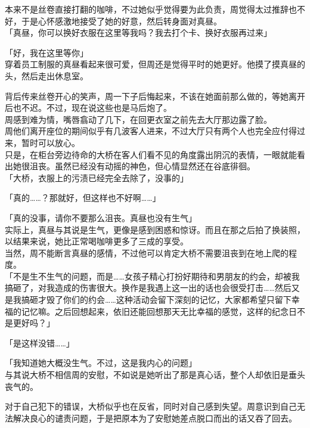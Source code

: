 本来不是丝卷直接打翻的咖啡，不过她似乎觉得要为此负责，周觉得太过推辞也不好，于是心怀感激地接受了她的好意，然后转身面对真昼。\\

「真昼，你可以换好衣服在这里等我吗？我去打个卡、换好衣服再过来」

「好，我在这里等你」\\

穿着员工制服的真昼看起来很可爱，但周还是觉得平时的她更好。他摸了摸真昼的头，然后走出休息室。

背后传来丝卷开心的笑声，周一下子后悔起来，不该在她面前那么做的，等她离开后也不迟。不过，现在说这些也是马后炮了。\\

周感到难为情，嘴唇翕动了几下，在回更衣室之前先去大厅那边露了脸。\\

周他们离开座位的期间似乎有几波客人进来，不过大厅只有两个人也完全应付得过来，暂时可以放心。\\

只是，在柜台旁边待命的大桥在客人们看不见的角度露出阴沉的表情，一眼就能看出她很沮丧。虽然已经没有动摇的神色，但心情显然还在谷底徘徊。\\

「大桥，衣服上的污渍已经完全去除了，没事的」

「真的……？那就好，但这样也不好啊……」

「真的没事，请你不要那么沮丧。真昼也没有生气」\\

实际上，真昼与其说是生气，更像是感到困惑和惊讶。而且在那之后拍了换装照，以结果来说，她比正常喝咖啡更多了三成的享受。\\

当然，周不能断言真昼的感情，不过他可以肯定大桥不需要沮丧到在地上爬的程度。\\

「不是生不生气的问题，而是……女孩子精心打扮好期待和男朋友的约会，却被我搞砸了，对我造成的伤害很大。换作是我遇上这一出的话也会很受打击……然后又是我搞砸才毁了你们的约会……这种活动会留下深刻的记忆，大家都希望只留下幸福的记忆嘛。之后回想起来，依旧还能回想那天无比幸福的感觉，这样的纪念日不是更好吗？」

「是这样没错……」

「我知道她大概没生气。不过，这是我内心的问题」\\

与其说大桥不相信周的安慰，不如说是她听出了那是真心话，整个人却依旧是垂头丧气的。

对于自己犯下的错误，大桥似乎也在反省，同时对自己感到失望。周意识到自己无法解决良心的谴责问题，于是把原本为了安慰她差点脱口而出的话又吞了回去。\\

